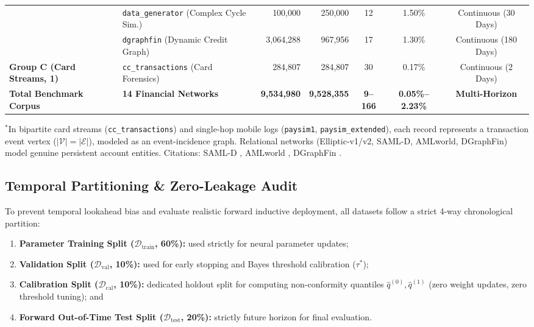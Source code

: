 \begin{table}[t]
{\begin{tabular}{llrrccc}
& \texttt{data\_generator} (Complex Cycle Sim.) & 100,000 & 250,000 & 12 & 1.50\% & Continuous (30 Days) \\
& \texttt{dgraphfin} (Dynamic Credit Graph) \citep{dgraphfin2022} & 3,064,288 & 967,956 & 17 & 1.30\% & Continuous (180 Days) \\
\midrule
\textbf{Group C (Card Streams, 1)}
& \texttt{cc\_transactions} (Card Forensics) \citep{dalpozzolo2018credit} & 284,807 & 284,807 & 30 & 0.17\% & Continuous (2 Days) \\
\midrule
\textbf{Total Benchmark Corpus} & \textbf{14 Financial Networks} & \textbf{9,534,980} & \textbf{9,528,355} & \textbf{9--166} & \textbf{0.05\%--2.23\%} & \textbf{Multi-Horizon} \\
\bottomrule
\end{tabular}%
}
\vspace{0.8ex}

\footnotesize{$^\ast$In bipartite card streams (\texttt{cc\_transactions}) and single-hop mobile logs (\texttt{paysim1}, \texttt{paysim\_extended}), each record represents a transaction event vertex ($|\mathcal{V}| = |\mathcal{E}|$), modeled as an event-incidence graph. Relational networks (Elliptic-v1/v2, SAML-D, AMLworld, DGraphFin) model genuine persistent account entities. Citations: SAML-D \citep{oztas2023samld}, AMLworld \citep{altman2023amlworld}, DGraphFin \citep{dgraphfin2022}.}
\end{table}

\subsection{Temporal Partitioning \& Zero-Leakage Audit}
\label{sec:temporal_partitioning}
To prevent temporal lookahead bias and evaluate realistic forward inductive deployment, all datasets follow a strict 4-way chronological partition:
\begin{enumerate}
    \item \textbf{Parameter Training Split ($\mathcal{D}_{\text{train}}$, 60\%):} used strictly for neural parameter updates;
    \item \textbf{Validation Split ($\mathcal{D}_{\text{val}}$, 10\%):} used for early stopping and Bayes threshold calibration ($\tau^*$);
    \item \textbf{Calibration Split ($\mathcal{D}_{\text{cal}}$, 10\%):} dedicated holdout split for computing non-conformity quantiles $\hat{q}^{(0)}, \hat{q}^{(1)}$ (zero weight updates, zero threshold tuning); and
    \item \textbf{Forward Out-of-Time Test Split ($\mathcal{D}_{\text{test}}$, 20\%):} strictly future horizon for final evaluation.
\end{enumerate}

